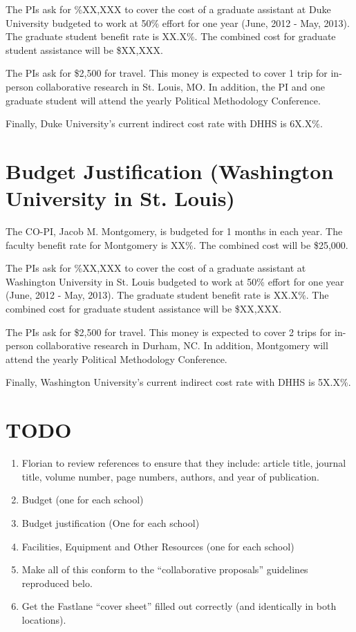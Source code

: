 \documentclass[pdftex,12pt,fullpage,oneside]{amsart}
\begin{document}
The PIs ask for \%XX,XXX to cover the cost of a graduate assistant at
Duke University budgeted to work at 50\% effort for one year (June,
2012 - May, 2013).  The graduate student benefit rate is XX.X\%.  The
combined cost for graduate student assistance will be \$XX,XXX.

The PIs ask for \$2,500 for travel.  This money is expected to cover 1
trip for in-person collaborative research in St. Louis, MO.  In addition,
the PI and one graduate student will attend the yearly Political
Methodology Conference.

Finally, Duke University's current indirect cost rate with DHHS is 6X.X\%.



\newpage
\setcounter{page}{1}
\thispagestyle{empty}

\section*{Budget Justification (Washington University in St. Louis)}

The CO-PI, Jacob M. Montgomery, is budgeted for 1 months in each year.  The
faculty benefit rate for Montgomery is XX\%.   The combined cost will
be \$25,000.

The PIs ask for \%XX,XXX to cover the cost of a graduate assistant at
Washington University in St. Louis budgeted to work at 50\% effort for one year
(June, 2012 - May, 2013).  The graduate student benefit rate is
XX.X\%.  The combined cost for graduate student assistance will be
\$XX,XXX.

The PIs ask for \$2,500 for travel.  This money is expected to cover 2
trips for in-person collaborative research in Durham, NC.  In
addition, Montgomery will attend the yearly Political Methodology
Conference.

Finally, Washington University's current indirect cost rate with DHHS is 5X.X\%.

\newpage
\setcounter{page}{1}
\section*{TODO}

\begin{enumerate}
\item Florian to review references to ensure that they include: article title,
  journal title, volume number, page numbers, authors, and year of
  publication.  
\item Budget (one for each school)
\item Budget justification (One for each school)
\item Facilities, Equipment and Other Resources (one for each school)
\item Make all of this conform to the ``collaborative proposals''
  guidelines reproduced belo.
\item Get the Fastlane ``cover sheet'' filled out correctly (and identically in
  both locations).
\end{enumerate}
\end{document}
